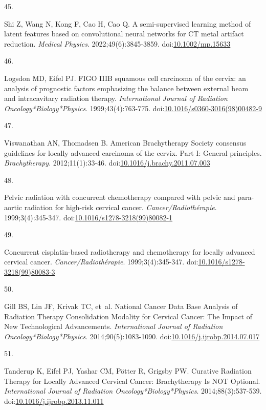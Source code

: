 \documentclass[
  a4paper,
]{scrreprt}
\newlength{\cslhangindent}
\newlength{\csllabelwidth}
\newlength{\cslentryspacingunit} %
\newenvironment{CSLReferences}[2] %
 {%
  \setlength{\parindent}{0pt}
  \ifodd #1
  \let\oldpar\par
  \def\par{\hangindent=\cslhangindent\oldpar}
  \fi
  \setlength{\parskip}{#2\cslentryspacingunit}
 }%
 {}
\newcommand{\CSLLeftMargin}[1]{\parbox[t]{\csllabelwidth}{#1}}
\newcommand{\CSLRightInline}[1]{\parbox[t]{\linewidth - \csllabelwidth}{#1}\break}
\begin{document}
\begin{CSLReferences}{0}{0}
\leavevmode{}%
\CSLLeftMargin{45. }%
\CSLRightInline{Shi Z, Wang N, Kong F, Cao H, Cao Q. A semi{-}supervised
learning method of latent features based on convolutional neural
networks for CT metal artifact reduction. \emph{Medical Physics}.
2022;49(6):3845-3859.
doi:\href{https://doi.org/10.1002/mp.15633}{10.1002/mp.15633}}

\leavevmode{}%
\CSLLeftMargin{46. }%
\CSLRightInline{Logsdon MD, Eifel PJ. FIGO IIIB squamous cell carcinoma
of the cervix: an analysis of prognostic factors emphasizing the balance
between external beam and intracavitary radiation therapy.
\emph{International Journal of Radiation Oncology*Biology*Physics}.
1999;43(4):763-775.
doi:\href{https://doi.org/10.1016/s0360-3016(98)00482-9}{10.1016/s0360-3016(98)00482-9}}

\leavevmode{}%
\CSLLeftMargin{47. }%
\CSLRightInline{Viswanathan AN, Thomadsen B. American Brachytherapy
Society consensus guidelines for locally advanced carcinoma of the
cervix. Part I: General principles. \emph{Brachytherapy}.
2012;11(1):33-46.
doi:\href{https://doi.org/10.1016/j.brachy.2011.07.003}{10.1016/j.brachy.2011.07.003}}

\leavevmode{}%
\CSLLeftMargin{48. }%
\CSLRightInline{Pelvic radiation with concurrent chemotherapy compared
with pelvic and para-aortic radiation for high-risk cervical cancer.
\emph{Cancer/Radiothérapie}. 1999;3(4):345-347.
doi:\href{https://doi.org/10.1016/s1278-3218(99)80082-1}{10.1016/s1278-3218(99)80082-1}}

\leavevmode{}%
\CSLLeftMargin{49. }%
\CSLRightInline{Concurrent cisplatin-based radiotherapy and chemotherapy
for locally advanced cervical cancer. \emph{Cancer/Radiothérapie}.
1999;3(4):345-347.
doi:\href{https://doi.org/10.1016/s1278-3218(99)80083-3}{10.1016/s1278-3218(99)80083-3}}

\leavevmode{}%
\CSLLeftMargin{50. }%
\CSLRightInline{Gill BS, Lin JF, Krivak TC, et~al. National Cancer Data
Base Analysis of Radiation Therapy Consolidation Modality for Cervical
Cancer: The Impact of New Technological Advancements.
\emph{International Journal of Radiation Oncology*Biology*Physics}.
2014;90(5):1083-1090.
doi:\href{https://doi.org/10.1016/j.ijrobp.2014.07.017}{10.1016/j.ijrobp.2014.07.017}}

\leavevmode{}%
\CSLLeftMargin{51. }%
\CSLRightInline{Tanderup K, Eifel PJ, Yashar CM, Pötter R, Grigsby PW.
Curative Radiation Therapy for Locally Advanced Cervical Cancer:
Brachytherapy Is NOT Optional. \emph{International Journal of Radiation
Oncology*Biology*Physics}. 2014;88(3):537-539.
doi:\href{https://doi.org/10.1016/j.ijrobp.2013.11.011}{10.1016/j.ijrobp.2013.11.011}}


\end{CSLReferences}
\end{document}
